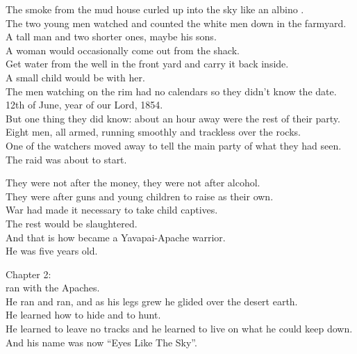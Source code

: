 The smoke from the mud house curled up into the sky like an albino . \\
The two young men watched and counted the white men down in the farmyard. \\
A tall man and two shorter ones, maybe his sons. \\
A woman would occasionally come out from the shack. \\
Get water from the well in the front yard and carry it back inside. \\
A small child would be with her. \\
The men watching on the rim had no calendars so they didn't know the date. \\
12th of June, year of our Lord, 1854. \\

But one thing they did know: about an hour away were the rest of their party. \\
Eight men, all armed, running smoothly and trackless over the rocks. \\
One of the watchers moved away to tell the main party of what they had seen. \\

The raid was about to start. \\




They were not after the money, they were not after alcohol. \\
They were after guns and young children to raise as their own. \\
War had made it necessary to take child captives. \\
The rest would be slaughtered. \\
And that is how  became a Yavapai-Apache warrior. \\
He was five years old. \\




Chapter 2: \\

 ran with the Apaches. \\
He ran and ran, and as his legs grew he glided over the desert earth. \\
He learned how to hide and to hunt. \\
He learned to leave no tracks and he learned to live on what he could keep down. \\
And his name was now ``Eyes Like The Sky''. \\

